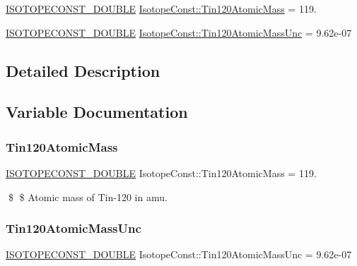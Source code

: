 \begin{DoxyCompactItemize}
\item 
\mbox{\hyperlink{group___isotope_const-_macros_ga8f45a7272ce02c0b4c65c44636ed719a}{I\+S\+O\+T\+O\+P\+E\+C\+O\+N\+S\+T\+\_\+\+D\+O\+U\+B\+LE}} \mbox{\hyperlink{group___isotope_const-_tin-_sn120_ga2efdbb09e0f7842cb45795903217f05d}{Isotope\+Const\+::\+Tin120\+Atomic\+Mass}} = 119.
\item 
\mbox{\hyperlink{group___isotope_const-_macros_ga8f45a7272ce02c0b4c65c44636ed719a}{I\+S\+O\+T\+O\+P\+E\+C\+O\+N\+S\+T\+\_\+\+D\+O\+U\+B\+LE}} \mbox{\hyperlink{group___isotope_const-_tin-_sn120_ga44f1c5d5d9036cc77eccdec64be2860a}{Isotope\+Const\+::\+Tin120\+Atomic\+Mass\+Unc}} = 9.\+62e-\/07
\end{DoxyCompactItemize}


\subsection{Detailed Description}


\subsection{Variable Documentation}
\mbox{\label{group___isotope_const-_tin-_sn120_ga2efdbb09e0f7842cb45795903217f05d}} 
\subsubsection{\texorpdfstring{Tin120\+Atomic\+Mass}{Tin120AtomicMass}}
{\footnotesize\ttfamily \mbox{\hyperlink{group___isotope_const-_macros_ga8f45a7272ce02c0b4c65c44636ed719a}{I\+S\+O\+T\+O\+P\+E\+C\+O\+N\+S\+T\+\_\+\+D\+O\+U\+B\+LE}} Isotope\+Const\+::\+Tin120\+Atomic\+Mass = 119.}

\$ \$ Atomic mass of Tin-\/120 in amu. \mbox{\label{group___isotope_const-_tin-_sn120_ga44f1c5d5d9036cc77eccdec64be2860a}} 
\subsubsection{\texorpdfstring{Tin120\+Atomic\+Mass\+Unc}{Tin120AtomicMassUnc}}
{\footnotesize\ttfamily \mbox{\hyperlink{group___isotope_const-_macros_ga8f45a7272ce02c0b4c65c44636ed719a}{I\+S\+O\+T\+O\+P\+E\+C\+O\+N\+S\+T\+\_\+\+D\+O\+U\+B\+LE}} Isotope\+Const\+::\+Tin120\+Atomic\+Mass\+Unc = 9.\+62e-\/07}

